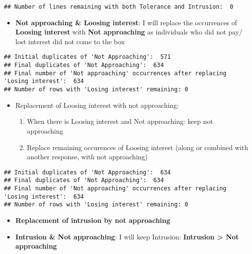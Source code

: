 \documentclass[
]{article}
\providecommand{\tightlist}{%
  \setlength{\itemsep}{0pt}\setlength{\parskip}{0pt}}
\begin{document}
\begin{verbatim}
## Number of lines remaining with both Tolerance and Intrusion:  0
\end{verbatim}

\begin{itemize}
\tightlist
\item
  \textbf{Not approaching \& Loosing interest}: I will replace the
  occurrences of \textbf{Loosing interest} with \textbf{Not approaching}
  as individuals who did not pay/ lost interest did not come to the box
\end{itemize}

\begin{verbatim}
## Initial duplicates of 'Not Approaching':  571 
## Final duplicates of 'Not Approaching':  634 
## Final number of 'Not approaching' occurrences after replacing 'Losing interest':  634 
## Number of rows with 'Losing interest' remaining: 0
\end{verbatim}

\begin{itemize}
\tightlist
\item
  Replacement of Loosing interest with not approaching:

  \begin{enumerate}
  \def\labelenumi{\arabic{enumi}.}
  \tightlist
  \item
    When there is Loosing interest and Not approaching: keep not
    approaching
  \item
    Replace remaining occurences of Loosing interest (along or combined
    with another response, with not approaching)
  \end{enumerate}
\end{itemize}

\begin{verbatim}
## Initial duplicates of 'Not Approaching':  634 
## Final duplicates of 'Not Approaching':  634 
## Final number of 'Not approaching' occurrences after replacing 'Losing interest':  634 
## Number of rows with 'Losing interest' remaining: 0
\end{verbatim}

\begin{itemize}
\tightlist
\item
  \textbf{Replacement of intrusion by not approaching}
\item
  \textbf{Intrusion \& Not approaching}: I will keep Intrusion:
  \textbf{Intrusion \textgreater{} Not approaching}
\end{itemize}
\end{document}
